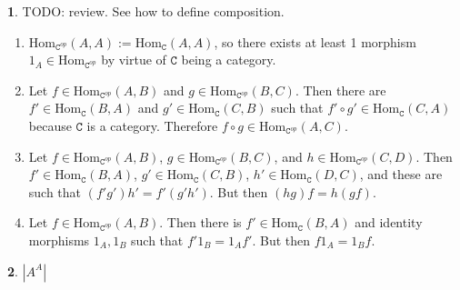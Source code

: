 \documentclass{article}
\theoremstyle{definition}
\theoremstyle{definition}
\theoremstyle{definition}
\newtheorem{solution-internal}{}[subsection]
\newenvironment{solution}{
  \medskip
  \begin{solution-internal}
}{
  \end{solution-internal}
}
\begin{document}
\setcounter{subsection}{3}
\setcounter{solution-internal}{0}
\newcommand{\Hom}{\text{Hom}}
\begin{solution}
  TODO: review. See how to define composition.
  \begin{enumerate}
    \item \(\Hom_{\texttt{C}^{op}}(A,A) := \Hom_{\texttt{C}}(A,A)\), so there
    exists at least 1 morphism \(1_A \in \Hom_{\texttt{C}^{op}}\) by virtue
    of \(\texttt{C}\) being a category.
    \item Let
    \(f \in \Hom_{\texttt{C}^{op}}(A,B)\) and
    \(g \in \Hom_{\texttt{C}^{op}}(B,C)\). Then there are
    \(f' \in \Hom_{\texttt{C}}(B,A)\) and
    \(g' \in \Hom_{\texttt{C}}(C,B)\) such that \(f' \circ g' \in
    \Hom_{\texttt{C}}(C,A)\) because \(\texttt{C}\) is a category. Therefore
    \(f \circ g \in \Hom_{\texttt{C}^{op}}(A,C)\).

    \item Let
    \(f \in \Hom_{\texttt{C}^{op}}(A,B)\),
    \(g \in \Hom_{\texttt{C}^{op}}(B,C)\), and
    \(h \in \Hom_{\texttt{C}^{op}}(C,D)\).
    Then
    \(f' \in \Hom_{\texttt{C}}(B,A)\),
    \(g' \in \Hom_{\texttt{C}}(C,B)\),
    \(h' \in \Hom_{\texttt{C}}(D,C)\), and these are such that
    \((f'g')h' = f'(g'h')\). But then \((hg)f = h(gf)\).

    \item Let
    \(f \in \Hom_{\texttt{C}^{op}}(A,B)\). Then there is
    \(f' \in \Hom_{\texttt{C}}(B,A)\) and identity morphisms \(1_A, 1_B\)
    such that \(f'1_B = 1_Af'\). But then \(f1_A = 1_Bf\).
  \end{enumerate}
\end{solution}

\begin{solution}
  \(|A^{A}|\)
\end{solution}
\end{document}
